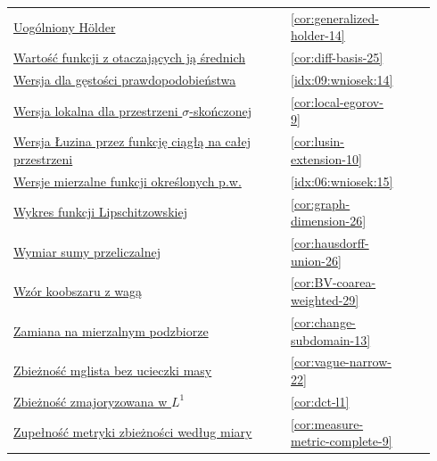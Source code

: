 \documentclass[11pt,a4paper,oneside]{book}
\numberwithin{equation}{chapter}
\theoremstyle{plain}
\theoremstyle{definition}
\theoremstyle{remark}
\begin{document}
\begin{longtable}{@{}p{0.72\linewidth}p{0.135\linewidth}p{0.08\linewidth}@{}}
\hyperref[cor:generalized-holder-14]{Uogólniony Hölder} & \ref*{cor:generalized-holder-14} & \pageref*{cor:generalized-holder-14} \\
\hyperref[cor:diff-basis-25]{Wartość funkcji z otaczających ją średnich} & \ref*{cor:diff-basis-25} & \pageref*{cor:diff-basis-25} \\
\hyperref[idx:09:wniosek:14]{Wersja dla gęstości prawdopodobieństwa} & \ref*{idx:09:wniosek:14} & \pageref*{idx:09:wniosek:14} \\
\hyperref[cor:local-egorov-9]{Wersja lokalna dla przestrzeni $\sigma$-skończonej} & \ref*{cor:local-egorov-9} & \pageref*{cor:local-egorov-9} \\
\hyperref[cor:lusin-extension-10]{Wersja Łuzina przez funkcję ciągłą na całej przestrzeni} & \ref*{cor:lusin-extension-10} & \pageref*{cor:lusin-extension-10} \\
\hyperref[idx:06:wniosek:15]{Wersje mierzalne funkcji określonych p.w.} & \ref*{idx:06:wniosek:15} & \pageref*{idx:06:wniosek:15} \\
\hyperref[cor:graph-dimension-26]{Wykres funkcji Lipschitzowskiej} & \ref*{cor:graph-dimension-26} & \pageref*{cor:graph-dimension-26} \\
\hyperref[cor:hausdorff-union-26]{Wymiar sumy przeliczalnej} & \ref*{cor:hausdorff-union-26} & \pageref*{cor:hausdorff-union-26} \\
\hyperref[cor:BV-coarea-weighted-29]{Wzór koobszaru z wagą} & \ref*{cor:BV-coarea-weighted-29} & \pageref*{cor:BV-coarea-weighted-29} \\
\hyperref[cor:change-subdomain-13]{Zamiana na mierzalnym podzbiorze} & \ref*{cor:change-subdomain-13} & \pageref*{cor:change-subdomain-13} \\
\hyperref[cor:vague-narrow-22]{Zbieżność mglista bez ucieczki masy} & \ref*{cor:vague-narrow-22} & \pageref*{cor:vague-narrow-22} \\
\hyperref[cor:dct-l1]{Zbieżność zmajoryzowana w $L^1$} & \ref*{cor:dct-l1} & \pageref*{cor:dct-l1} \\
\hyperref[cor:measure-metric-complete-9]{Zupełność metryki zbieżności według miary} & \ref*{cor:measure-metric-complete-9} & \pageref*{cor:measure-metric-complete-9} \\
\end{longtable}
\endgroup



\end{document}
